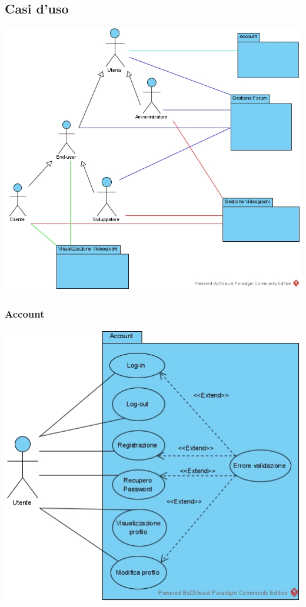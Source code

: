 \subsection{Casi d'uso}
\begin{center}
\includegraphics[width=\textwidth,height=\textheight,keepaspectratio]{Figure/UseCases/Generale.jpg}
\end{center}
\subsubsection{Account}
\begin{center}
\includegraphics[width=\textwidth,height=\textheight,keepaspectratio]{Figure/UseCases/Account.jpg}
\end{center}

